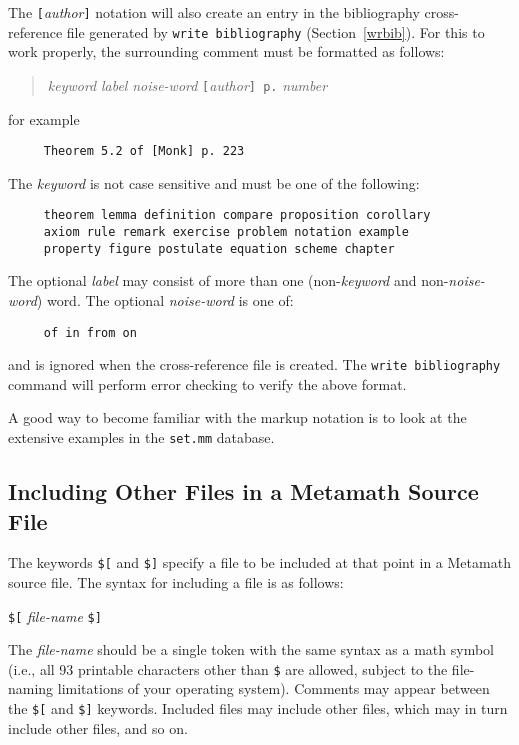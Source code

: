 The \texttt{[}{\em author}\texttt{]} notation will also create an entry in
the bibliography cross-reference file generated by \texttt{write
bibliography} (Section~\ref{wrbib}).  For this to work properly, the
surrounding comment must be formatted as follows:
\begin{quote}
    {\em keyword} {\em label} {\em noise-word}
     \texttt{[}{\em author}\texttt{] p.} {\em number}
\end{quote}
for example
\begin{verbatim}
     Theorem 5.2 of [Monk] p. 223
\end{verbatim}
The {\em keyword} is not case sensitive and must be one of the following:
\begin{verbatim}
     theorem lemma definition compare proposition corollary
     axiom rule remark exercise problem notation example
     property figure postulate equation scheme chapter
\end{verbatim}
The optional {\em label} may consist of more than one
(non-{\em keyword} and non-{\em noise-word}) word.
The optional {\em noise-word} is one of:
\begin{verbatim}
     of in from on
\end{verbatim}
and is  ignored when the cross-reference file is created.  The
\texttt{write
biblio\-graphy} command will perform error checking to verify the
above format.

A good way to become familiar with the markup notation is to look at
the extensive examples in the \texttt{set.mm} database.


\subsection{Including Other Files in a Metamath Source File} \label{include}

The keywords \texttt{\$[} and \texttt{\$]} specify a file to be
included at that point in a
Metamath source file.  The syntax for
including a file is as follows:
\begin{center}
\texttt{\$[} {\em file-name} \texttt{\$]}
\end{center}

The {\em file-name} should be a single token with the same syntax
as a math symbol (i.e., all 93 printable characters other than \texttt{\$} are
allowed, subject to the file-naming limitations of your operating system).
Comments may appear between the \texttt{\$[} and \texttt{\$]} keywords.  Included
files may include other files, which may in turn include other files, and so
on.

